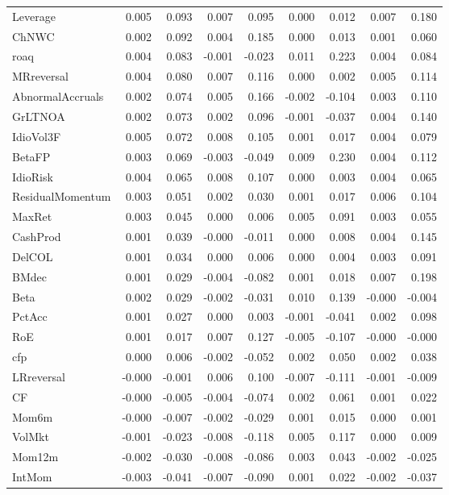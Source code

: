 \begin{tabular}{lrrrrrrrr}
Leverage & 0.005 & 0.093 & 0.007 & 0.095 & 0.000 & 0.012 & 0.007 & 0.180 \\
ChNWC & 0.002 & 0.092 & 0.004 & 0.185 & 0.000 & 0.013 & 0.001 & 0.060 \\
roaq & 0.004 & 0.083 & -0.001 & -0.023 & 0.011 & 0.223 & 0.004 & 0.084 \\
MRreversal & 0.004 & 0.080 & 0.007 & 0.116 & 0.000 & 0.002 & 0.005 & 0.114 \\
AbnormalAccruals & 0.002 & 0.074 & 0.005 & 0.166 & -0.002 & -0.104 & 0.003 & 0.110 \\
GrLTNOA & 0.002 & 0.073 & 0.002 & 0.096 & -0.001 & -0.037 & 0.004 & 0.140 \\
IdioVol3F & 0.005 & 0.072 & 0.008 & 0.105 & 0.001 & 0.017 & 0.004 & 0.079 \\
BetaFP & 0.003 & 0.069 & -0.003 & -0.049 & 0.009 & 0.230 & 0.004 & 0.112 \\
IdioRisk & 0.004 & 0.065 & 0.008 & 0.107 & 0.000 & 0.003 & 0.004 & 0.065 \\
ResidualMomentum & 0.003 & 0.051 & 0.002 & 0.030 & 0.001 & 0.017 & 0.006 & 0.104 \\
MaxRet & 0.003 & 0.045 & 0.000 & 0.006 & 0.005 & 0.091 & 0.003 & 0.055 \\
CashProd & 0.001 & 0.039 & -0.000 & -0.011 & 0.000 & 0.008 & 0.004 & 0.145 \\
DelCOL & 0.001 & 0.034 & 0.000 & 0.006 & 0.000 & 0.004 & 0.003 & 0.091 \\
BMdec & 0.001 & 0.029 & -0.004 & -0.082 & 0.001 & 0.018 & 0.007 & 0.198 \\
Beta & 0.002 & 0.029 & -0.002 & -0.031 & 0.010 & 0.139 & -0.000 & -0.004 \\
PctAcc & 0.001 & 0.027 & 0.000 & 0.003 & -0.001 & -0.041 & 0.002 & 0.098 \\
RoE & 0.001 & 0.017 & 0.007 & 0.127 & -0.005 & -0.107 & -0.000 & -0.000 \\
cfp & 0.000 & 0.006 & -0.002 & -0.052 & 0.002 & 0.050 & 0.002 & 0.038 \\
LRreversal & -0.000 & -0.001 & 0.006 & 0.100 & -0.007 & -0.111 & -0.001 & -0.009 \\
CF & -0.000 & -0.005 & -0.004 & -0.074 & 0.002 & 0.061 & 0.001 & 0.022 \\
Mom6m & -0.000 & -0.007 & -0.002 & -0.029 & 0.001 & 0.015 & 0.000 & 0.001 \\
VolMkt & -0.001 & -0.023 & -0.008 & -0.118 & 0.005 & 0.117 & 0.000 & 0.009 \\
Mom12m & -0.002 & -0.030 & -0.008 & -0.086 & 0.003 & 0.043 & -0.002 & -0.025 \\
IntMom & -0.003 & -0.041 & -0.007 & -0.090 & 0.001 & 0.022 & -0.002 & -0.037 \\
\bottomrule
\end{tabular}
